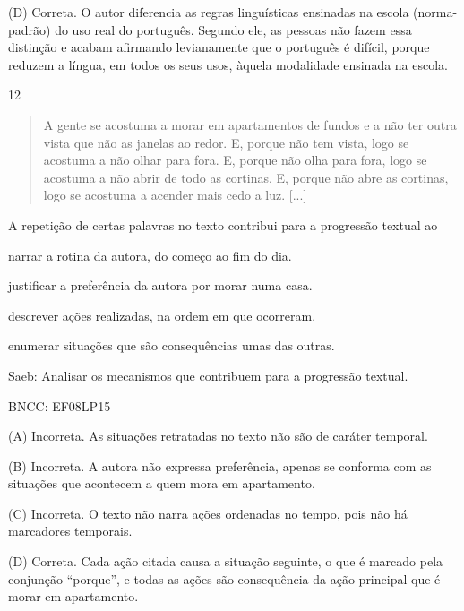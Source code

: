 (D) Correta. O autor diferencia as regras linguísticas ensinadas na
escola (norma-padrão) do uso real do português. Segundo ele, as pessoas
não fazem essa distinção e acabam afirmando levianamente que o português
é difícil, porque reduzem a língua, em todos os seus usos, àquela
modalidade ensinada na escola.

\num{12}

\begin{quote}
A gente se acostuma a morar em apartamentos de fundos e a não ter outra
vista que não as janelas ao redor. E, porque não tem vista, logo se
acostuma a não olhar para fora. E, porque não olha para fora, logo se
acostuma a não abrir de todo as cortinas. E, porque não abre as
cortinas, logo se acostuma a acender mais cedo a luz. {[}...{]}
\end{quote}


A repetição de certas palavras no texto contribui para a progressão
textual ao

\begin{escolha}
\item narrar a rotina da autora, do começo ao fim do dia.

\item justificar a preferência da autora por morar numa casa.

\item descrever ações realizadas, na ordem em que ocorreram.

\item enumerar situações que são consequências umas das outras.
\end{escolha}

Saeb: Analisar os mecanismos que contribuem para a progressão textual.

BNCC: EF08LP15

(A) Incorreta. As situações retratadas no texto não são de caráter
temporal.

(B) Incorreta. A autora não expressa preferência, apenas se conforma com
as situações que acontecem a quem mora em apartamento.

(C) Incorreta. O texto não narra ações ordenadas no tempo, pois não há
marcadores temporais.

(D) Correta. Cada ação citada causa a situação seguinte, o que é marcado
pela conjunção ``porque'', e todas as ações são consequência da ação
principal que é morar em apartamento.

